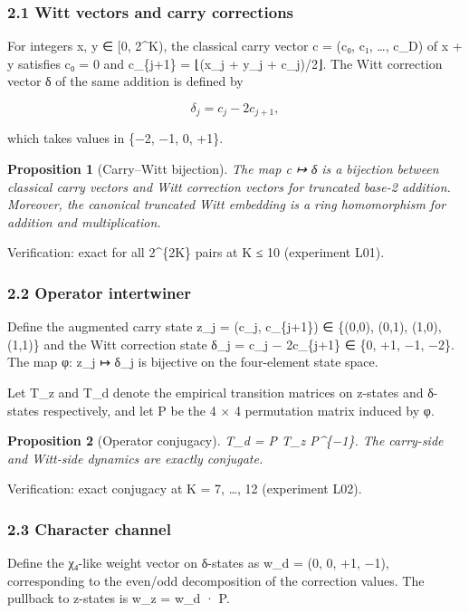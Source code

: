 \documentclass[
  11pt,
]{article}
\begin{document}
\subsubsection{2.1 Witt vectors and carry
corrections}\label{witt-vectors-and-carry-corrections}

For integers x, y ∈ {[}0, 2\^{}K), the classical carry vector c = (c₀, c₁,
\ldots, c\_D) of x + y satisfies c₀ = 0 and c\_\{j+1\} = ⌊(x\_j + y\_j +
c\_j)/2⌋. The Witt correction vector δ of the same addition is defined by

\[\delta_j = c_j - 2 c_{j+1},\]

which takes values in \{−2, −1, 0, +1\}.

\textbf{Proposition 1} (Carry--Witt bijection). \emph{The map c ↦ δ is a
bijection between classical carry vectors and Witt correction vectors for
truncated base-2 addition. Moreover, the canonical truncated Witt embedding is a
ring homomorphism for addition and multiplication.}

Verification: exact for all 2\^{}\{2K\} pairs at K ≤ 10 (experiment L01).

\subsubsection{2.2 Operator intertwiner}\label{operator-intertwiner}

Define the augmented carry state z\_j = (c\_j, c\_\{j+1\}) ∈ \{(0,0), (0,1),
(1,0), (1,1)\} and the Witt correction state δ\_j = c\_j − 2c\_\{j+1\} ∈ \{0,
+1, −1, −2\}. The map φ: z\_j ↦ δ\_j is bijective on the four-element state
space.

Let T\_z and T\_d denote the empirical transition matrices on z-states and
δ-states respectively, and let P be the 4 × 4 permutation matrix induced by φ.

\textbf{Proposition 2} (Operator conjugacy). \emph{T\_d = P T\_z P\^{}\{−1\}.
The carry-side and Witt-side dynamics are exactly conjugate.}

Verification: exact conjugacy at K = 7, \ldots, 12 (experiment L02).

\subsubsection{2.3 Character channel}\label{character-channel}

Define the χ₄-like weight vector on δ-states as w\_d = (0, 0, +1, −1),
corresponding to the even/odd decomposition of the correction values. The
pullback to z-states is w\_z = w\_d · P.
\end{document}
